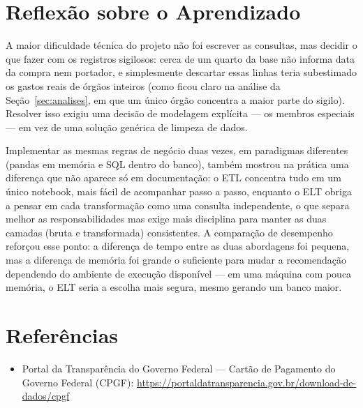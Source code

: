 \documentclass[12pt,a4paper]{article}
\newcommand{\code}[1]{\texttt{\detokenize{#1}}}
\begin{document}
\section{Reflexão sobre o Aprendizado}

A maior dificuldade técnica do projeto não foi escrever as consultas, mas
decidir o que fazer com os registros sigilosos: cerca de um quarto da base
não informa data da compra nem portador, e simplesmente descartar essas
linhas teria subestimado os gastos reais de órgãos inteiros (como ficou
claro na análise da Seção~\ref{sec:analises}, em que um único órgão
concentra a maior parte do sigilo). Resolver isso exigiu uma decisão de
modelagem explícita --- os membros especiais \code{-1} --- em vez de uma
solução genérica de limpeza de dados.

Implementar as mesmas regras de negócio duas vezes, em paradigmas
diferentes (pandas em memória e SQL dentro do banco), também mostrou na
prática uma diferença que não aparece só em documentação: o ETL concentra
tudo em um único notebook, mais fácil de acompanhar passo a passo, enquanto
o ELT obriga a pensar em cada transformação como uma consulta
independente, o que separa melhor as responsabilidades mas exige mais
disciplina para manter as duas camadas (bruta e transformada) consistentes.
A comparação de desempenho reforçou esse ponto: a diferença de tempo entre
as duas abordagens foi pequena, mas a diferença de memória foi grande o
suficiente para mudar a recomendação dependendo do ambiente de execução
disponível --- em uma máquina com pouca memória, o ELT seria a escolha mais
segura, mesmo gerando um banco maior.

\section*{Referências}

\begin{itemize}
    \item Portal da Transparência do Governo Federal --- Cartão de
    Pagamento do Governo Federal (CPGF):
    \url{https://portaldatransparencia.gov.br/download-de-dados/cpgf}
\end{itemize}
\end{document}
